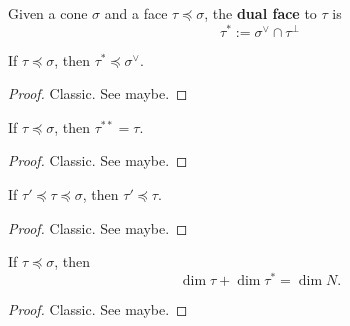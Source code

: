 \begin{definition}
  \label{1-2-10-dual-face}

  Given a cone $\sigma$ and a face $\tau \preceq \sigma$, the {\bf dual face} to $\tau$ is
  $$\tau^* := \sigma^\vee \cap \tau^\perp$$
\end{definition}


\begin{proposition}
  \label{1-2-10-dual-face-face-dual}

  If $\tau \preceq \sigma$, then $\tau^* \preceq \sigma^\vee$.
\end{proposition}
\begin{proof}

  Classic. See \cite{Oda_1988} maybe.
\end{proof}


\begin{proposition}
  \label{1-2-10-double-dual-face-dual-face}

  If $\tau \preceq \sigma$, then $\tau^{**} = \tau$.
\end{proposition}
\begin{proof}

  Classic. See \cite{Oda_1988} maybe.
\end{proof}


\begin{proposition}
  \label{1-2-10-dual-face-antitone}

  If $\tau' \preceq \tau \preceq \sigma$, then $\tau' \preceq \tau$.
\end{proposition}
\begin{proof}

  Classic. See \cite{Oda_1988} maybe.
\end{proof}


\begin{proposition}
  \label{1-2-10-dim-dual-face}

  If $\tau \preceq \sigma$, then
  $$\dim \tau + \dim \tau^* = \dim N.$$
\end{proposition}
\begin{proof}

  Classic. See \cite{Oda_1988} maybe.
\end{proof}


